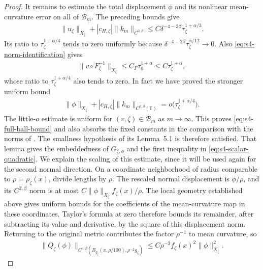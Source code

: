 \documentclass[a4paper,11pt,oneside,reqno]{amsart}
\numberwithin{equation}{section}
\theoremstyle{definition}
\begin{document}
\begin{proof}
    It remains to estimate the total displacement $\phi$
    and its nonlinear mean-curvature error on all of
    $\mathcal B_m$.
    The preceding bounds give
    \begin{align*}
        \|u_\zeta\|_{X_\zeta}
        +|c_{H,\zeta}|\|k_m\|_{C^{0,\beta}}
        \leq C\delta^{-4-2\beta}\tau_\zeta^{1+\alpha/3}.
    \end{align*}
    Its ratio to $\tau_\zeta^{1+\alpha/4}$ tends to zero
    uniformly because
    $\delta^{-4-2\beta}\tau_\zeta^{\alpha/12}\to0$.
    Also \eqref{eq:s4-norm-identification} gives
    \begin{align*}
        \|v\circ F_\zeta^{-1}\|_{X_\zeta}
        \leq C_F\tau_0^{1+\alpha}
        \leq C\tau_\zeta^{1+\alpha},
    \end{align*}
    whose ratio to $\tau_\zeta^{1+\alpha/4}$ also tends to
    zero. In fact we have proved the stronger uniform bound
    \begin{align*}
        \|\phi\|_{X_\zeta}
        +|c_{H,\zeta}|\|k_m\|_{C^{0,\beta}(\mathbb T)}
        =o\bigl(\tau_\zeta^{1+\alpha/4}\bigr).
    \end{align*}
    The little-$o$ estimate is uniform for
    $(v,\zeta)\in\mathcal B_m$ as $m\to\infty$.
    This proves \eqref{eq:s4-full-ball-bound} and also absorbs
    the fixed constants in the comparison with the norms of
    \cite{KapouleasMcGrathLD}. The smallness hypothesis of
    its Lemma~5.1 is therefore satisfied. That lemma gives the embeddedness
    of $G_{\zeta,\phi}$ and the first inequality in
    \eqref{eq:s4-scalar-quadratic}. We explain the scaling
    of this estimate, since it will be used again for the
    second normal direction. On a coordinate neighborhood
    of radius comparable to $\rho=\rho_\zeta(x)$, divide
    lengths by $\rho$. The rescaled normal displacement is
    $\phi/\rho$, and its $C^{2,\beta}$ norm is at most
    $C\|\phi\|_{X_\zeta}f_\zeta(x)/\rho$.
    The local geometry established above gives uniform bounds
    for the coefficients of the mean-curvature map in these
    coordinates. Taylor's formula at zero therefore bounds
    its remainder, after subtracting its value and derivative,
    by the square of this displacement norm. Returning to
    the original metric contributes the factor $\rho^{-1}$
    to mean curvature, so
    \begin{align*}
        \|Q_\zeta(\phi)\|_{C^{0,\beta}
          (B_{g_\zeta}(x,\rho/100),\rho^{-2}g_\zeta)}
        \leq C\rho^{-3}f_\zeta(x)^2\|\phi\|_{X_\zeta}^2.

\end{align*}
\end{proof}
\end{document}
